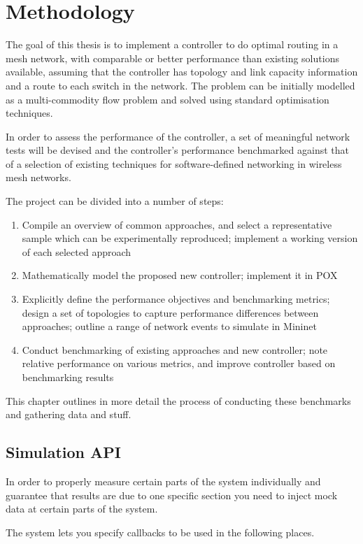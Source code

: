 \chapter{Methodology}

The goal of this thesis is to implement a controller to do optimal routing in a mesh network, with comparable or better performance than existing solutions available, assuming that the controller has topology and link capacity information and a route to each switch in the network. The problem can be initially modelled as a multi-commodity flow problem and solved using standard optimisation techniques.

In order to assess the performance of the controller, a set of meaningful network tests will be devised and the controller's performance benchmarked against that of a selection of existing techniques for software-defined networking in wireless mesh networks.

The project can be divided into a number of steps:

\begin{enumerate}
\item Compile an overview of common approaches, and select a representative sample which can be experimentally reproduced; implement a working version of each selected approach
\item Mathematically model the proposed new controller; implement it in POX
\item Explicitly define the performance objectives and benchmarking metrics; design a set of topologies to capture performance differences between approaches; outline a range of network events to simulate in Mininet 
\item Conduct benchmarking of existing approaches and new controller; note relative performance on various metrics, and improve controller based on benchmarking results
\end{enumerate}

This chapter outlines in more detail the process of conducting these benchmarks and gathering data and stuff.

\section{Simulation API}
In order to properly measure certain parts of the system individually and guarantee that results are due to one specific section you need to inject mock data at certain parts of the system.

The system lets you specify callbacks to be used in the following places.

